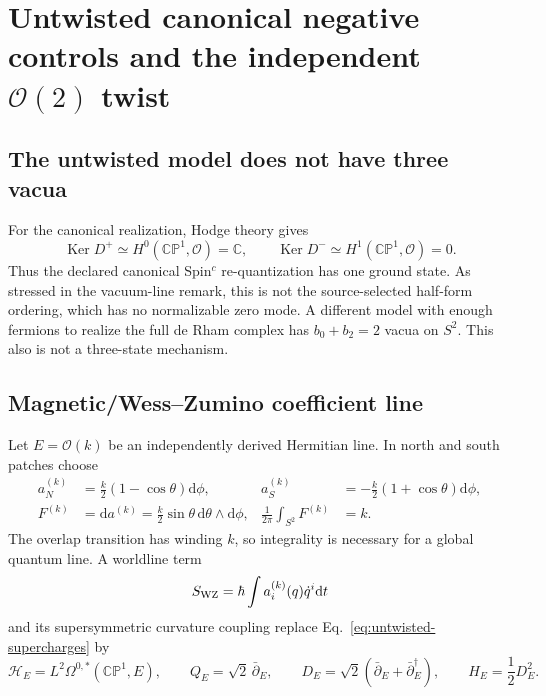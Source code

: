 \documentclass[11pt]{article}
\theoremstyle{definition}
\theoremstyle{remark}
\newcommand{\dd}{\mathrm d}
\newcommand{\CC}{\mathbb C}
\newcommand{\CP}{\mathbb {CP}}
\newcommand{\cO}{\mathcal O}
\newcommand{\cH}{\mathcal H}
\newcommand{\Ker}{\operatorname{Ker}}
\begin{document}
\section{Untwisted canonical negative controls and the independent
\texorpdfstring{\(\cO(2)\)}{O(2)} twist}

\subsection{The untwisted model does not have three vacua}

For the canonical realization, Hodge theory gives
\begin{equation}
 \Ker D^+\simeq H^0(\CP^1,\cO)=\CC,
 \qquad
 \Ker D^-\simeq H^1(\CP^1,\cO)=0.
 \label{eq:untwisted-count}
\end{equation}
Thus the declared canonical Spin\({}^c\) re-quantization has one ground
state.  As stressed in the vacuum-line remark, this is not the
source-selected half-form ordering, which has no normalizable zero mode.
A different model
with enough fermions to realize the full de Rham complex has
\(b_0+b_2=2\) vacua on \(S^2\).  This also is not a three-state mechanism.

\subsection{Magnetic/Wess--Zumino coefficient line}

Let \(E=\cO(k)\) be an independently derived Hermitian line.  In north and
south patches choose
\begin{align}
 a_N^{(k)}&=\frac{k}{2}(1-\cos\theta)\dd\phi,
 &a_S^{(k)}&=-\frac{k}{2}(1+\cos\theta)\dd\phi,
 \label{eq:monopole-connections}\\
 F^{(k)}&=\dd a^{(k)}=\frac{k}{2}\sin\theta\,
 \dd\theta\wedge\dd\phi,
 &\frac1{2\pi}\int_{S^2}F^{(k)}&=k.
 \label{eq:monopole-flux}
\end{align}
The overlap transition has winding \(k\), so integrality is necessary for a
global quantum line.  A worldline term
\begin{equation}
 S_{\rm WZ}=\hbar\int a^{(k)}_i(q)\dot q^i\dd t
 \label{eq:worldline-wz}
\end{equation}
and its supersymmetric curvature coupling replace
Eq.~\eqref{eq:untwisted-supercharges} by
\begin{equation}
 \cH_E=L^2\Omega^{0,*}(\CP^1,E),\qquad
 Q_E=\sqrt2\,\bar\partial_E,\qquad
 D_E=\sqrt2(\bar\partial_E+\bar\partial_E^\dagger),
 \qquad H_E=\frac12D_E^2.
 \label{eq:twisted-supercharges}
\end{equation}
\end{document}

